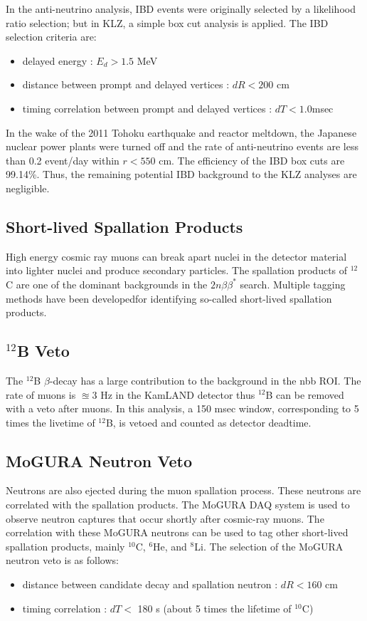 In the anti-neutrino analysis, IBD events were originally selected by a likelihood ratio selection; but in KLZ, a simple box cut analysis is applied. The IBD selection criteria are:
\begin{itemize}
	\item delayed energy : $E_d>1.5$ MeV
	\item distance between prompt and delayed vertices : $dR<200$ cm
	\item timing correlation between prompt and delayed vertices : $dT < 1.0$msec
\end{itemize}
In the wake of the 2011 Tohoku earthquake and reactor meltdown, the Japanese nuclear power plants were turned off and the rate of anti-neutrino events are less than 0.2 event/day within $r<550$ cm. The efficiency of the IBD box cuts are 99.14\%. Thus, the remaining potential IBD background to the KLZ analyses are negligible.
\subsection{Short-lived Spallation Products}
High energy cosmic ray muons can break apart nuclei in the detector material into lighter nuclei and produce secondary particles. The spallation products of $^{12}$C are one of the dominant backgrounds in the $2n\beta\beta^*$ search. Multiple tagging methods have been developedfor identifying so-called short-lived spallation products.
\subsection*{$^{12}$B Veto}
The $^{12}$B $\beta$-decay has a large contribution to the background in the \0nbb ROI. The rate of muons is $\approxeq 3$ Hz in the KamLAND detector thus $^{12}$B can be removed with a veto after muons. In this analysis, a 150 msec window, corresponding to 5 times the livetime of $^{12}$B, is vetoed and counted as detector deadtime.

\subsection*{MoGURA Neutron Veto}
\label{sec:mogura_neutron_veto}
Neutrons are also ejected during the muon spallation process. These neutrons are correlated with the spallation products. The MoGURA DAQ system is used to observe neutron captures that occur shortly after cosmic-ray muons. The correlation with these MoGURA neutrons can be used to tag other short-lived spallation products, mainly $^{10}$C, $^{6}$He, and $^{8}$Li. The selection of the MoGURA neutron veto is as follows:
\begin{itemize}
	\item distance between candidate decay and spallation neutron : $dR<160$ cm
	\item timing correlation : $dT < $ 180 s (about 5 times the lifetime of $^{10}$C)
\end{itemize}

